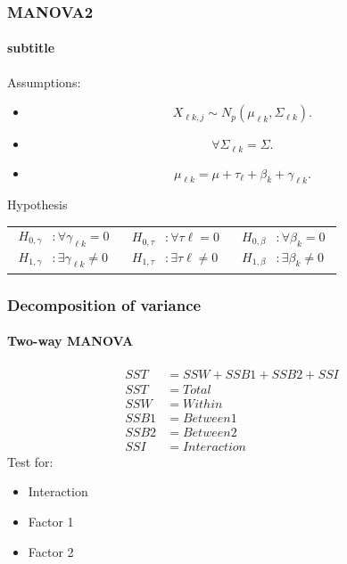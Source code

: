 \documentclass[aspectratio=169,10pt,t]{beamer}
\begin{document}
\begin{frame}[t]
	\frametitle{MANOVA2}
	\framesubtitle{subtitle}

	Assumptions:
	\begin{itemize}
		\item 
			\[
				X_{\ell k,j} \sim N_{p}  \left( \mu_{\ell k}, \Sigma_{\ell k}  \right) 
			.\] 
		\item 
			\[
				\forall \Sigma_{\ell k} = \Sigma
			.\] 
		\item 
			\[
			\mu_{\ell k} = \mu + \tau_{\ell} + \beta_{k} + \gamma_{\ell k}
			.\] 
	\end{itemize}

	Hypothesis\\
	\begin{centering}
		
	\begin{tabular}{ccc}
		$
		\begin{aligned}
			H_{0,\gamma} &: \forall \gamma_{\ell k} = 0\\
			H_{1,\gamma} &: \exists \gamma_{\ell k} \neq 0
		\end{aligned}
		$ & $
		\begin{aligned}
			H_{0,\tau} &: \forall \tau{\ell} = 0\\
			H_{1,\tau} &: \exists \tau{\ell} \neq 0
		\end{aligned}
			$	& $
		\begin{aligned}
			H_{0,\beta} &: \forall \beta_{k} = 0\\
			H_{1,\beta} &: \exists \beta_{k} \neq 0
		\end{aligned}
				$
	\end{tabular}
		\end{centering}
\end{frame}
\begin{frame}[t]
	\frametitle{Decomposition of variance}
	\framesubtitle{Two-way MANOVA}
	\[
	\begin{aligned}
        SST &= SSW + SSB1 + SSB2 + SSI \\
        SST &= Total \\
		SSW &= Within \\
		SSB1 &= Between 1 \\
		SSB2 &= Between 2 \\
		SSI &= Interaction
	\end{aligned}
	\] 
	Test for:\\
	\begin{itemize}
	    \item Interaction
	    \item Factor 1
	    \item Factor 2
	\end{itemize}

\end{frame}
\end{document}
